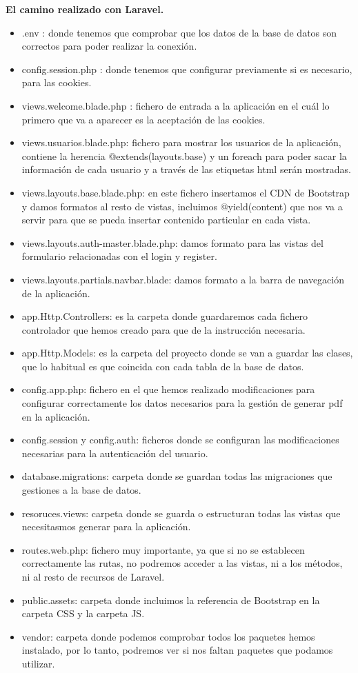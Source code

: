 \documentclass{article}
\begin{document}
\textbf{El camino realizado con Laravel.}
\begin{itemize}
    \item .env : donde tenemos que comprobar que los datos de la base de datos son correctos para poder realizar la conexión.
    \item config.session.php : donde tenemos que configurar previamente si es necesario, para las cookies.
    \item views.welcome.blade.php : fichero de entrada a la aplicación en el cuál lo primero que va a aparecer es la aceptación de las cookies.
    \item views.usuarios.blade.php: fichero para mostrar los usuarios de la aplicación, contiene la herencia @extends(layouts.base) y un foreach para poder sacar la información de cada usuario y a través de las etiquetas html serán mostradas.
    \item views.layouts.base.blade.php: en este fichero insertamos el CDN de Bootstrap y damos formatos al resto de vistas, incluimos @yield(content) que nos va a servir para que se pueda insertar contenido particular en cada vista.
    \item views.layouts.auth-master.blade.php: damos formato para las vistas del formulario relacionadas con el login y register.
    \item views.layouts.partials.navbar.blade: damos formato a la barra de navegación de la aplicación.
    \item app.Http.Controllers: es la carpeta donde guardaremos cada fichero controlador que hemos creado para que de la instrucción necesaria.
    \item app.Http.Models: es la carpeta del proyecto donde se van a guardar las clases, que lo habitual es que coincida con cada tabla de la base de datos.
    \item config.app.php: fichero en el que hemos realizado modificaciones para configurar correctamente los datos necesarios para la gestión de generar pdf en la aplicación.
    \item config.session y config.auth: ficheros donde se configuran las modificaciones necesarias para la autenticación del usuario. 
    \item database.migrations: carpeta donde se guardan todas las migraciones que gestiones a la base de datos.
    \item resoruces.views: carpeta donde se guarda o estructuran todas las vistas que necesitasmos generar para la aplicación.
    \item routes.web.php: fichero muy importante, ya que si no se establecen correctamente las rutas, no podremos acceder a las vistas, ni a los métodos, ni al resto de recursos de Laravel.
    \item public.assets: carpeta donde incluimos la referencia de Bootstrap en la carpeta CSS y  la carpeta JS.
    \item vendor: carpeta donde podemos comprobar todos los paquetes hemos instalado, por lo tanto, podremos ver si nos faltan paquetes que podamos utilizar.\\
    
\end{itemize}
\end{document}
